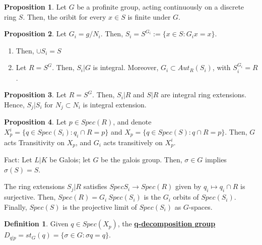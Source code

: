 \documentclass{article}
\theoremstyle{definition}
\theoremstyle{definition}
\theoremstyle{definition}
\newtheorem{proposition}{Proposition}[section]
\theoremstyle{definition}
\theoremstyle{definition}
\newtheorem{definition}{Definition}[section]
\theoremstyle{definition}
\theoremstyle{definition}
\begin{document}
\begin{tcolorbox}[colback=blue!5!white,colframe=blue!30!white]
\begin{proposition}
    Let $G$ be a profinite group, acting continuously on a discrete ring $S$.  Then, the oribit for every $x\in S$ is finite under $G$. 
\end{proposition}
\end{tcolorbox}


\begin{tcolorbox}[colback=blue!5!white,colframe=blue!30!white]
\begin{proposition}
Let $G_i=g/N_i$. Then, $S_i=S^{G_i}:= \{ x\in S: G_ix=x \}$. 
\begin{enumerate}
    \item Then, $\cup S_i=S$
\item Let $R=S^G$. Then, $S_i|G$ is integral. Moreover, $G_i\subset Aut_R(S_i)$, with $S_i^{G_i}=R$.
\end{enumerate}
\end{proposition}
\end{tcolorbox}


\begin{tcolorbox}[colback=blue!5!white,colframe=blue!30!white]
\begin{proposition}
    Let $R=S^G$. Then, $S_i|R$ and $S|R$ are integral ring extensions. Hence, $S_j|S_i$ for $N_j\subset N_i$ is integral extension.
\end{proposition}
\end{tcolorbox}


\begin{tcolorbox}[colback=blue!5!white,colframe=blue!30!white]
\begin{proposition}
Let $p\in Spec(R)$, and denote $X^i_p=\{ q\in Spec(S_i):q_i\cap R=p \}$ and $X_p=\{ q\in Spec(S):q\cap R=p \}$. Then, $G$ acts Transitivity on $X_p$, and $G_i$ acts transitively on $X^i_p$.
 \end{proposition}
\end{tcolorbox}

Fact: Let $L|K$ be Galois; let $G$ be the galois group. Then, $\sigma\in G$ implies $\sigma(S)=S$. 



The ring extensions $S_j|R$ satisfies $Spec S_i\to Spec(R)$ given by $q_i\mapsto q_i\cap R$ is surjective. Then, $Spec(R)=G_i\ Spec(S_i)$ is the $G_i$ orbits of $Spec(S_i)$. Finally, $Spec(S)$ is the projective limit of $Spec(S_i)$ as $G$-spaces. 


\begin{tcolorbox}[colback=purple!5!white,colframe=purple!75!black]
\begin{definition}
Given $q\in Spec(X_p)$, the \underline{\textbf{q-decomposition group}} $D_{q|p}=st_G(q)=\{ \sigma\in G:\sigma q=q \}$. 
\end{definition}
\end{tcolorbox}
\end{document}
